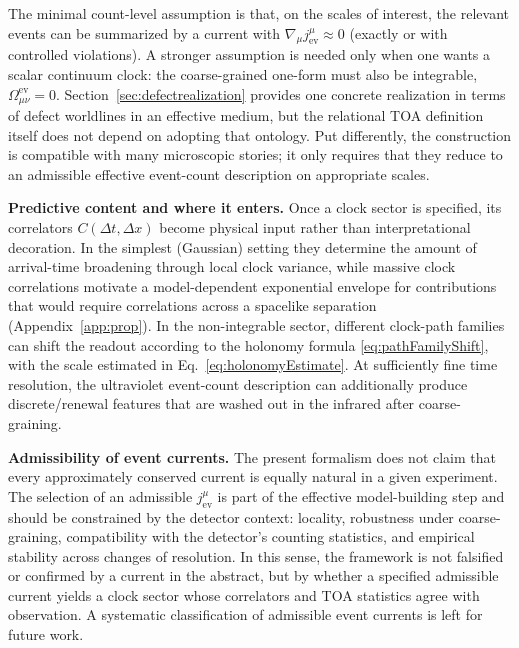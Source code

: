 \documentclass[11pt, a4paper]{article}
\theoremstyle{definition}
\theoremstyle{plain}
\theoremstyle{remark}
\numberwithin{equation}{section}
\begin{document}
        The minimal count-level assumption is that, on the scales of interest, the relevant events can be summarized by a current with $\nabla_\mu j^\mu_{\mathrm{ev}}\approx 0$ (exactly or with controlled violations). A stronger assumption is needed only when one wants a scalar continuum clock: the coarse-grained one-form must also be integrable, $\Omega^{\mathrm{ev}}_{\mu\nu}=0$. Section~\ref{sec:defectrealization} provides one concrete realization in terms of defect worldlines in an effective medium, but the relational TOA definition itself does not depend on adopting that ontology. Put differently, the construction is compatible with many microscopic stories; it only requires that they reduce to an admissible effective event-count description on appropriate scales.
        
        \medskip
        \noindent
        \textbf{Predictive content and where it enters.}
        Once a clock sector is specified, its correlators $C(\Delta t,\Delta x)$ become physical input rather than interpretational decoration. In the simplest (Gaussian) setting they determine the amount of arrival-time broadening through local clock variance, while massive clock correlations motivate a model-dependent exponential envelope for contributions that would require correlations across a spacelike separation (Appendix~\ref{app:prop}). In the non-integrable sector, different clock-path families can shift the readout according to the holonomy formula \eqref{eq:pathFamilyShift}, with the scale estimated in Eq.~\eqref{eq:holonomyEstimate}. At sufficiently fine time resolution, the ultraviolet event-count description can additionally produce discrete/renewal features that are washed out in the infrared after coarse-graining.

        \medskip
        \noindent
        \textbf{Admissibility of event currents.}
        The present formalism does not claim that every approximately conserved current is equally natural in a given experiment. The selection of an admissible $j^\mu_{\mathrm{ev}}$ is part of the effective model-building step and should be constrained by the detector context: locality, robustness under coarse-graining, compatibility with the detector's counting statistics, and empirical stability across changes of resolution. In this sense, the framework is not falsified or confirmed by a current in the abstract, but by whether a specified admissible current yields a clock sector whose correlators and TOA statistics agree with observation. A systematic classification of admissible event currents is left for future work.
    
\end{document}
